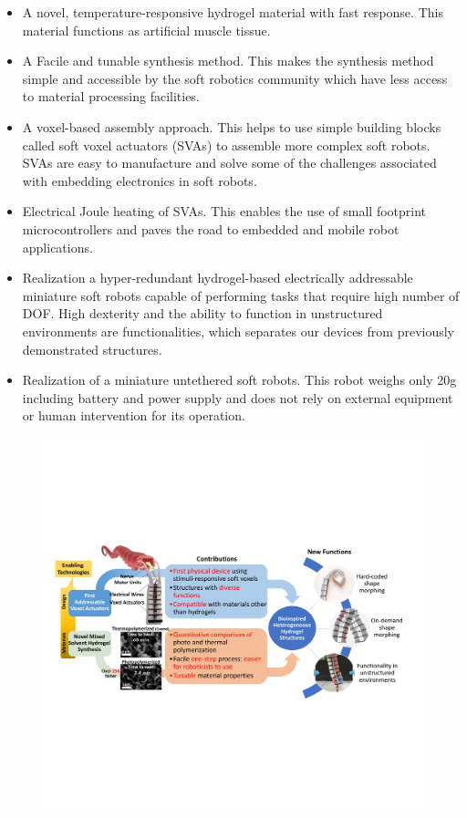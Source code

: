 {\begin{itemize}
	\item A novel, temperature-responsive hydrogel material with fast response. This material functions as artificial muscle tissue. 
	\item A Facile and tunable synthesis method. This makes the synthesis method simple and accessible by the soft robotics community which have less access to material processing facilities.
	\item A voxel-based assembly approach. This helps to use simple building blocks called soft voxel actuators (SVAs) to assemble more complex soft robots. SVAs are easy to manufacture and solve some of the challenges associated with embedding electronics in soft robots.
	\item Electrical Joule heating of SVAs. This enables the use of small footprint microcontrollers and paves the road to embedded and mobile robot applications.
	\item Realization a hyper-redundant hydrogel-based electrically addressable miniature soft robots capable of performing tasks that require high number of DOF. High dexterity and the ability to function in unstructured environments are functionalities, which separates our devices from previously demonstrated structures.
	\item Realization of a miniature untethered soft robots. This robot weighs only 20g including battery and power supply and does not rely on external equipment or human intervention for its operation.
\end{itemize}
\begin{figure}[!ht]
      \centering
      \includegraphics[width=\textwidth]{summary.pdf}

\end{figure}}

